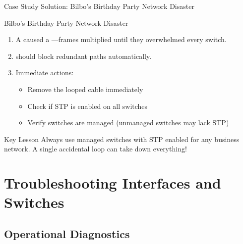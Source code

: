 \documentclass[aspectratio=169]{beamer}  %
\begin{document}
\begin{frame}{Case Study Solution: Bilbo's Birthday Party Network Disaster}
    \begin{casesolution}{Bilbo's Birthday Party Network Disaster}
        \begin{enumerate}
            \item A  caused a ---frames multiplied until they overwhelmed every switch.
            \item {} should block redundant paths automatically.
            \item Immediate actions:
                \begin{itemize}
                    \item Remove the looped cable immediately
                    \item Check if STP is enabled on all switches
                    \item Verify switches are managed (unmanaged switches may lack STP)
                \end{itemize}
        \end{enumerate}
    \end{casesolution}
    
    \vspace{0.3em}
    \begin{alertblock}{Key Lesson}
        Always use managed switches with STP enabled for any business network. A single accidental loop can take down everything!
    \end{alertblock}
\end{frame}

\section{Troubleshooting Interfaces and Switches}
\subsection{Operational Diagnostics}
\end{document}
